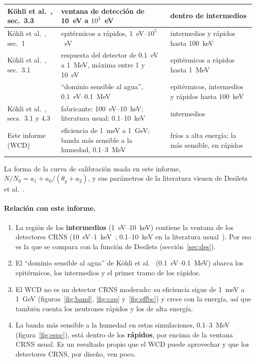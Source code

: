 \documentclass[11pt,a4paper]{article}
\begin{document}
\begin{table}[H]
\begin{tabular}{p{3.6cm}p{5.6cm}p{5.4cm}}
Köhli et al.~\cite{Kohli2015}, sec.~3.3 & ventana de detección de 10~eV a $10^3$~eV & dentro de intermedios \\
\midrule
Köhli et al.~\cite{Kohli2018}, sec.~1 & epitérmicos a rápidos, 1~eV--$10^5$~eV & intermedios y rápidos hasta 100~keV \\
Köhli et al.~\cite{Kohli2018}, sec.~3.1 & respuesta del detector de 0.1~eV a 1~MeV, máxima entre 1 y 10~eV & epitérmicos a rápidos hasta 1~MeV \\
 & ``dominio sensible al agua'', 0.1~eV--0.1~MeV & epitérmicos, intermedios y rápidos hasta 100~keV \\
Köhli et al.~\cite{Kohli2018}, secs.~3.1 y 4.3 & fabricante: 100~eV--10~keV; literatura usual: 0.1--10~keV & intermedios \\
\midrule
Este informe (WCD) & eficiencia de 1~meV a 1~GeV; banda más sensible a la humedad, 0.1--3~MeV & fríos a alta energía; la más sensible, en rápidos \\
\bottomrule
\end{tabular}

\end{table}

La forma de la curva de calibración usada en este informe, $N/N_0 = a_1 + a_0/(\theta_g + a_2)$, y sus parámetros de
la literatura vienen de Desilets et al.~\cite{Desilets2010}.

\paragraph{Relación con este informe.}
\begin{enumerate}
\item La región de los \textbf{intermedios} (1~eV--10~keV) contiene la ventana de los detectores CRNS
(10~eV--1~keV~\cite{Kohli2015}; 0.1--10~keV en la literatura usual~\cite{Kohli2018}). Por eso es la que se compara con
la función de Desilets (sección~\ref{sec:des}).
\item El ``dominio sensible al agua'' de Köhli et al.~\cite{Kohli2018} (0.1~eV--0.1~MeV) abarca los epitérmicos, los
intermedios y el primer tramo de los rápidos.
\item El WCD no es un detector CRNS moderado: su eficiencia sigue de 1~meV a 1~GeV (figuras~\ref{fig:band},
\ref{fig:cap} y~\ref{fig:effbc}) y crece con la energía, así que también cuenta los neutrones rápidos y los de alta
energía.
\item La banda más sensible a la humedad en estas simulaciones, 0.1--3~MeV (figura~\ref{fig:espc}), está dentro de los
\textbf{rápidos}, por encima de la ventana CRNS usual. Es un resultado propio que el WCD puede aprovechar y que los
detectores CRNS, por diseño, ven poco.
\end{enumerate}
\end{document}
